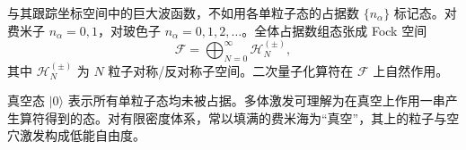 与其跟踪坐标空间中的巨大波函数，不如用各单粒子态的占据数 $\{n_\alpha\}$ 标记态。对费米子 $n_\alpha=0,1$，对玻色子 $n_\alpha=0,1,2,\ldots$。全体占据数组态张成 Fock 空间
\begin{equation}
  \mathcal{F}
  =\bigoplus_{N=0}^\infty \mathcal{H}_N^{(\pm)},
\end{equation}
其中 $\mathcal{H}_N^{(\pm)}$ 为 $N$ 粒子对称/反对称子空间。二次量子化算符在 $\mathcal{F}$ 上自然作用。

\begin{note}
真空态 $|0\rangle$ 表示所有单粒子态均未被占据。多体激发可理解为在真空上作用一串产生算符得到的态。对有限密度体系，常以填满的费米海为“真空”，其上的粒子与空穴激发构成低能自由度。
\end{note}
